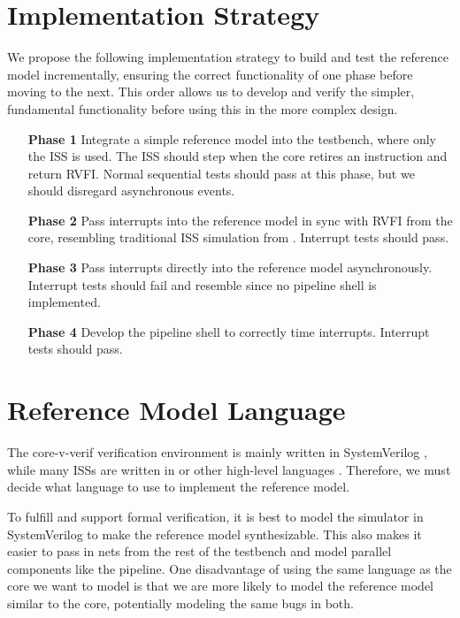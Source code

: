 \section{Implementation Strategy}
\label{sec:strategy}

We propose the following implementation strategy to build and test the reference model incrementally, ensuring the correct functionality of one phase before moving to the next. This order allows us to develop and verify the simpler, fundamental functionality before using this in the more complex design.

\begin{enumerate}[leftmargin=20mm]
    \item[\textbf{Phase 1}] Integrate a simple reference model into the testbench, where only the ISS is used. The ISS should step when the core retires an instruction and return RVFI. Normal sequential tests should pass at this phase, but we should disregard asynchronous events. \label{phase:iss}
    \item[\textbf{Phase 2}] Pass interrupts into the reference model in sync with RVFI from the core, resembling traditional ISS simulation from . Interrupt tests should pass. \label{phase:rvfi_interrupt}
    \item[\textbf{Phase 3}] Pass interrupts directly into the reference model asynchronously. Interrupt tests should fail and resemble  since no pipeline shell is implemented.\label{phase:async_fail}
    \item[\textbf{Phase 4}] Develop the pipeline shell to correctly time interrupts. Interrupt tests should pass. \label{phase:pipeline_shell}
\end{enumerate}




\section{Reference Model Language}

The core-v-verif verification environment is mainly written in SystemVerilog \cite{openhwgroupOpenhwgroupCorevverif2023}, while many ISSs are written in \cpp or other high-level languages \cite{SpikeRISCVISA2023}.
Therefore, we must decide what language to use to implement the reference model.

To fulfill  and support formal verification, it is best to model the simulator in SystemVerilog to make the reference model synthesizable. This also makes it easier to pass in nets from the rest of the testbench and model parallel components like the pipeline. One disadvantage of using the same language as the core we want to model is that we are more likely to model the reference model similar to the core, potentially modeling the same bugs in both. 


